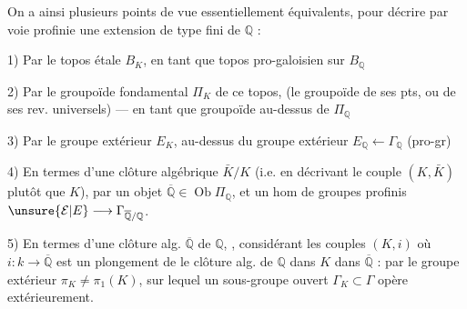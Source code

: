 On a ainsi plusieurs points de vue essentiellement équivalents, pour décrire par voie profinie une extension  de type fini de $\mathbb Q$ :

1) Par le topos étale $B_K$, en tant que topos pro-galoisien sur $B_{\mathbb Q}$

2) Par le groupoïde fondamental $\Pi_K$ de ce topos, (le groupoïde de ses pts, ou de ses rev. universels) --- en tant que groupoïde au-dessus de $\Pi_{\mathbb Q}$

 3) Par le groupe extérieur $E_K$, au-dessus du groupe extérieur $E_{\mathbb Q}\longleftarrow\Gamma_{\mathbb Q}$ (pro-gr)

4) En termes d'une clôture algébrique $\bar K/K$ (i.e. en décrivant le couple $(K,\bar K)$ plutôt que $K$), par un objet $\overline{\mathbb Q}\in\operatorname{Ob}\Pi_{\mathbb Q}$, et un hom de groupes profinis $\unsure{\mathcal E|E}\longrightarrow\Gamma_{\overline{\mathbb Q}/\mathbb Q}$.

5) En termes d'une clôture alg.  $\overline{\mathbb Q}$ de $\mathbb Q$, ,  considérant les couples $(K,i)$ où $i:k\longrightarrow\overline{\mathbb Q}$ est un plongement de le clôture alg. de $\mathbb Q$ dans $K$ dans $\overline{\mathbb Q}$ :  par le groupe extérieur $\pi_K\neq\pi_1(K)$, sur lequel un sous-groupe ouvert $\Gamma_K\subset\Gamma$ opère extérieurement.

